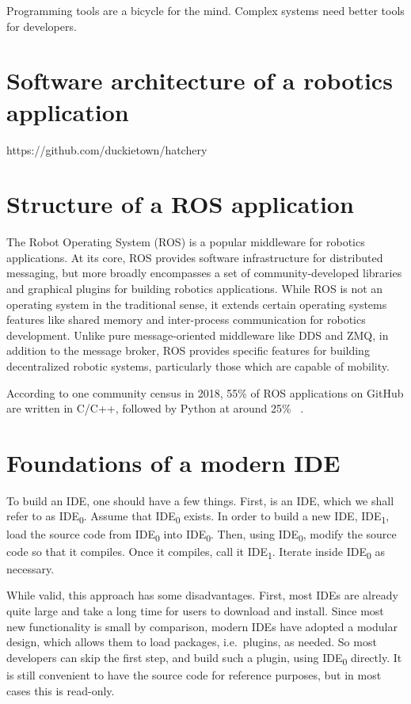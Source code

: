 \documentclass[12pt,initial,twoside,maitrise]{dms}
\numberwithin{equation}{section}
\numberwithin{table}{chapter}
\numberwithin{figure}{chapter}
\begin{document}
Programming tools are a bicycle for the mind. Complex systems need better tools for developers.

\section{Software architecture of a robotics application}

https://github.com/duckietown/hatchery

\section{Structure of a ROS application}

The Robot Operating System (ROS) is a popular middleware for robotics applications. At its core, ROS provides software infrastructure for distributed messaging, but more broadly encompasses a set of community-developed libraries and graphical plugins for building robotics applications. While ROS is not an operating system in the traditional sense, it extends certain operating systems features like shared memory and inter-process communication for robotics development. Unlike pure message-oriented middleware like DDS and ZMQ, in addition to the message broker, ROS provides specific features for building decentralized robotic systems, particularly those which are capable of mobility.

According to one community census in 2018, 55\% of ROS applications on GitHub are written in C/C++, followed by Python at around 25\% ~\cite{Areserio54:online}.

\section{Foundations of a modern IDE}

To build an IDE, one should have a few things. First, is an IDE, which we shall refer to as IDE\textsubscript{0}. Assume that IDE\textsubscript{0} exists. In order to build a new IDE, IDE\textsubscript{1}, load the source code from IDE\textsubscript{0} into IDE\textsubscript{0}. Then, using IDE\textsubscript{0}, modify the source code so that it compiles. Once it compiles, call it IDE\textsubscript{1}. Iterate inside IDE\textsubscript{0} as necessary.

While valid, this approach has some disadvantages. First, most IDEs are already quite large and take a long time for users to download and install. Since most new functionality is small by comparison, modern IDEs have adopted a modular design, which allows them to load packages, i.e.\ plugins, as needed. So most developers can skip the first step, and build such a plugin, using IDE\textsubscript{0} directly. It is still convenient to have the source code for reference purposes, but in most cases this is read-only.
\end{document}
